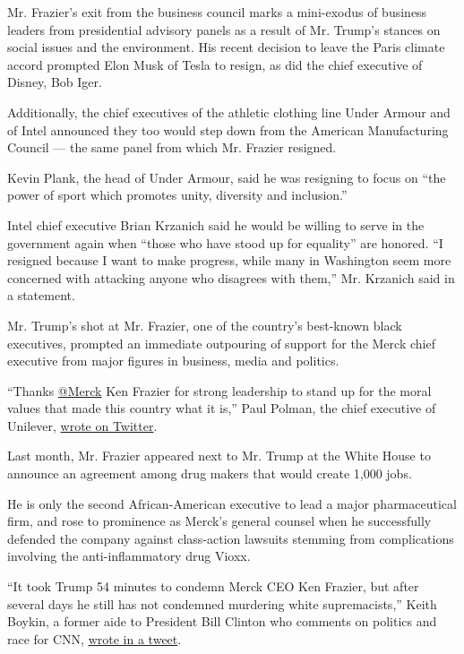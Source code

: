 Mr. Frazier's exit from the business council marks a mini-exodus of
business leaders from presidential advisory panels as a result of Mr.
Trump's stances on social issues and the environment. His recent
decision to leave the Paris climate accord prompted Elon Musk of Tesla
to resign, as did the chief executive of Disney, Bob Iger.

Additionally, the chief executives of the athletic clothing line Under
Armour and of Intel announced they too would step down from the American
Manufacturing Council --- the same panel from which Mr. Frazier
resigned.

Kevin Plank, the head of Under Armour, said he was resigning to focus on
``the power of sport which promotes unity, diversity and inclusion.''

Intel chief executive Brian Krzanich said he would be willing to serve
in the government again when ``those who have stood up for equality''
are honored. ``I resigned because I want to make progress, while many in
Washington seem more concerned with attacking anyone who disagrees with
them,'' Mr. Krzanich said in a statement.

Mr. Trump's shot at Mr. Frazier, one of the country's best-known black
executives, prompted an immediate outpouring of support for the Merck
chief executive from major figures in business, media and politics.

``Thanks \href{https://twitter.com/Merck}{@Merck} Ken Frazier for strong
leadership to stand up for the moral values that made this country what
it is,'' Paul Polman, the chief executive of Unilever,
\href{https://twitter.com/PaulPolman/status/897104757340467200}{wrote on
Twitter}.

Last month, Mr. Frazier appeared next to Mr. Trump at the White House to
announce an agreement among drug makers that would create 1,000 jobs.

He is only the second African-American executive to lead a major
pharmaceutical firm, and rose to prominence as Merck's general counsel
when he successfully defended the company against class-action lawsuits
stemming from complications involving the anti-inflammatory drug Vioxx.

``It took Trump 54 minutes to condemn Merck CEO Ken Frazier, but after
several days he still has not condemned murdering white supremacists,''
Keith Boykin, a former aide to President Bill Clinton who comments on
politics and race for CNN,
\href{https://twitter.com/keithboykin/status/897084712920985601}{wrote
in a tweet}.

